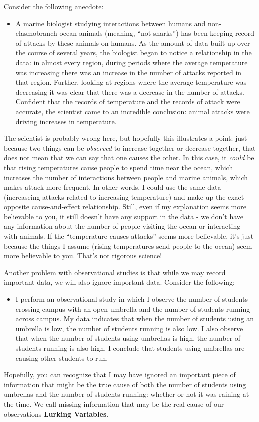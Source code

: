 \documentclass[11pt]{article}\usepackage[]{graphicx}\usepackage[]{color}
\begin{document}
\begin{itemize}
Consider the following anecdote:
\begin{itemize}
\item [] A marine biologist studying interactions between humans and non-elasmobranch ocean animals (meaning, ``not sharks'') has been keeping record of attacks by these animals on humans. As the amount of data built up over the course of several years, the biologist began to notice a relationship in the data: in almost every region, during periods where the average temperature was increasing there was an increase in the number of attacks reported in that region.  Further, looking at regions where the average temperature was decreasing it was clear that there was a decrease in the number of attacks.  Confident that the records of temperature and the records of attack were accurate, the scientist came to an incredible conclusion: animal attacks were driving increases in temperature.
\end{itemize}
The scientist is probably wrong here, but hopefully this illustrates a point: just because two things can be \emph{observed} to increase together or decrease together, that does not mean that we can say that one causes the other. In this case, it \emph{could} be that rising temperatures cause people to spend time near the ocean, which increases the number of interactions between people and marine animals, which makes attack more frequent. In other words, I could use the same data (increaseing attacks related to increasing temperature) and make up the exact opposite cause-and-effect relationship. 
Still, even if my explanation seems more believable to you, it still doesn't have any support in the data - we don't have any information about the number of people visiting the ocean or interacting with animals.
If the ``temperature causes attacks'' seems more believable, it's just because the things I assume (rising temperatures send people to the ocean) seem more believable to you. That's not rigorous science!

Another problem with observational studies is that while we may record important data, we will also ignore important data. Consider the following:
\begin{itemize}
\item [] I perform an observational study in which I observe the number of students crossing campus with an open umbrella and the number of students running across campus. My data indicates that when the number of students using an umbrella is low, the number of students running is also low. I also observe that when the number of students using umbrellas is high, the number of students running is also high. I conclude that students using umbrellas are causing other students to run.
\end{itemize}
Hopefully, you can recognize that I may have ignored an important piece of information that might be the true cause of both the number of students using umbrellas and the number of students running: whether or not it was raining at the time. We call missing information that may be the real cause of our observations \textbf{Lurking Variables}.


\end{itemize}
\end{document}
